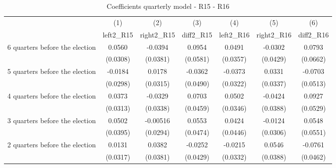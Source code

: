 \begin{table}[!ht]\centering \footnotesize
\def\sym#1{\ifmmode^{#1}\else\(^{#1}\)\fi}
\caption{Coefficients quarterly model - R15 - R16}
\begin{tabular}{l*{6}{c}}
\hline\hline
                    &\multicolumn{1}{c}{(1)}&\multicolumn{1}{c}{(2)}&\multicolumn{1}{c}{(3)}&\multicolumn{1}{c}{(4)}&\multicolumn{1}{c}{(5)}&\multicolumn{1}{c}{(6)}\\
                    &\multicolumn{1}{c}{left2\_R15}&\multicolumn{1}{c}{right2\_R15}&\multicolumn{1}{c}{diff2\_R15}&\multicolumn{1}{c}{left2\_R16}&\multicolumn{1}{c}{right2\_R16}&\multicolumn{1}{c}{diff2\_R16}\\
\hline
 6 quarters before the election&      0.0560         &     -0.0394         &      0.0954         &      0.0491         &     -0.0302         &      0.0793         \\
                    &    (0.0308)         &    (0.0381)         &    (0.0581)         &    (0.0357)         &    (0.0429)         &    (0.0662)         \\
[1em]
 5 quarters before the election&     -0.0184         &      0.0178         &     -0.0362         &     -0.0373         &      0.0331         &     -0.0703         \\
                    &    (0.0298)         &    (0.0315)         &    (0.0490)         &    (0.0322)         &    (0.0337)         &    (0.0513)         \\
[1em]
 4 quarters before the election&      0.0373         &     -0.0329         &      0.0703         &      0.0502         &     -0.0424         &      0.0927         \\
                    &    (0.0313)         &    (0.0338)         &    (0.0459)         &    (0.0346)         &    (0.0388)         &    (0.0529)         \\
[1em]
 3 quarters before the election&      0.0502         &    -0.00516         &      0.0553         &      0.0424         &     -0.0124         &      0.0548         \\
                    &    (0.0395)         &    (0.0294)         &    (0.0474)         &    (0.0446)         &    (0.0306)         &    (0.0551)         \\
[1em]
 2 quarters before the election&      0.0131         &      0.0382         &     -0.0252         &     -0.0215         &      0.0546         &     -0.0761         \\
                    &    (0.0317)         &    (0.0381)         &    (0.0429)         &    (0.0332)         &    (0.0388)         &    (0.0462)         \\

\end{tabular}
\end{table}
